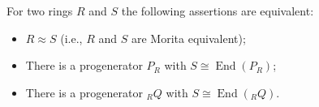 For two rings $R$ and $S$ the following assertions are equivalent:

\begin{itemize}
\item[(a)] $R \approx S$ (i.e., $R$ and $S$ are Morita equivalent);
\item[(b)] There is a progenerator $P_R$ with $S \cong \operatorname{End}(P_R)$;
\item[(c)] There is a progenerator ${}_R Q$ with $S \cong \operatorname{End}({}_R Q)$.
\end{itemize}
